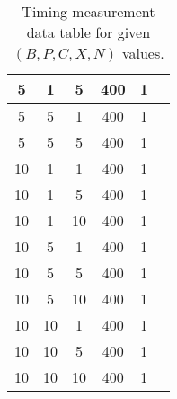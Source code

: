 \begin{enumerate}
\begin{table}[H]
\begin{center}
\begin{tabular}{|c|c|c|c|c|c|}
5   & 1   & 5   & 400   & 1   &   \\ \hline
5   & 5   & 1   & 400   & 1   &   \\ \hline
5   & 5   & 5   & 400   & 1   &   \\ \hline
10   & 1   & 1   & 400   & 1   &   \\ \hline
10   & 1   & 5   & 400   & 1   &   \\ \hline
10   & 1   & 10   & 400   & 1   &   \\ \hline
10   & 5   & 1   & 400   & 1   &   \\ \hline
10   & 5   & 5   & 400   & 1   &   \\ \hline
10   & 5   & 10   & 400   & 1   &   \\ \hline
10   & 10   & 1   & 400   & 1   &   \\ \hline
10   & 10   & 5   & 400   & 1   &   \\ \hline
10   & 10   & 10   & 400   & 1   &   \\ \hline
\end{tabular}
\caption{Timing measurement data table for given $(B, P, C, X, N)$ values.}
\label{tb_timing_lab3}
\end{center}
\end{table}


\end{enumerate}
